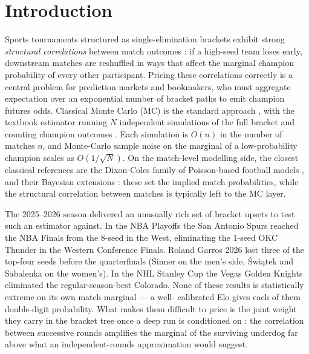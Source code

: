 \documentclass[11pt]{article}
\begin{document}
\begin{abstract}
A prospective prediction for the FIFA World Cup 2026 (kickoff
June 11, 2026) is issued in the same form : mid-tier nations (NED,
BEL, AUT, COL) upweighted by 2--3 percentage points, top European
favourites (FRA, ESP, BRA) commensurately reduced. ARG is the notable
exception among top favourites --- upweighted $+6.14$\,pp because its
balanced-draw path runs through a softer Conmebol-heavy quarter.

At simulator scales (15 qubits) we make no claim of quantum advantage.
The contribution is conceptual : the encoding captures bracket
structural correlations that classical Monte Carlo only reproduces
via explicit path-by-path conditioning, and the construction scales
tractably toward the 50--100 logical qubits expected from early
fault-tolerant hardware.
\end{abstract}

\section{Introduction}
\label{sec:intro}

Sports tournaments structured as single-elimination brackets exhibit
strong \emph{structural correlations} between match outcomes : if a
high-seed team loses early, downstream matches are reshuffled in
ways that affect the marginal champion probability of every other
participant. Pricing these correlations correctly is a central
problem for prediction markets and bookmakers, who must aggregate
expectation over an exponential number of bracket paths to emit
champion futures odds. Classical Monte Carlo (MC) is the standard
approach \cite{glasserman2004monte}, with the textbook estimator
running $N$ independent simulations of the full bracket and counting
champion outcomes \cite{simulate_bracket_pulsquant}. Each simulation is
$O(n)$ in the number of matches $n$, and Monte-Carlo sample noise on
the marginal of a low-probability champion scales as $O(1/\sqrt{N})$.
On the match-level modelling side, the closest classical references
are the Dixon-Coles family of Poisson-based football models
\cite{dixon1997modelling}, and their Bayesian extensions
\cite{constantinou2017bayesian} : these set the implied match
probabilities, while the structural correlation between matches is
typically left to the MC layer.

The 2025--2026 season delivered an unusually rich set of bracket
upsets to test such an estimator against. In the NBA Playoffs the
San Antonio Spurs reached the NBA Finals from the 8-seed in the
West, eliminating the 1-seed OKC Thunder in the Western Conference
Finals. Roland Garros 2026 lost three of the top-four seeds before
the quarterfinals (Sinner on the men's side, Świątek and Sabalenka
on the women's). In the NHL Stanley Cup the Vegas Golden Knights
eliminated the regular-season-best Colorado. None of these results
is statistically extreme on its own match marginal --- a well-
calibrated Elo gives each of them double-digit probability. What
makes them difficult to price is the joint weight they carry in the
bracket tree once a deep run is conditioned on : the correlation
between successive rounds amplifies the marginal of the surviving
underdog far above what an independent-rounds approximation would
suggest.
\end{document}
